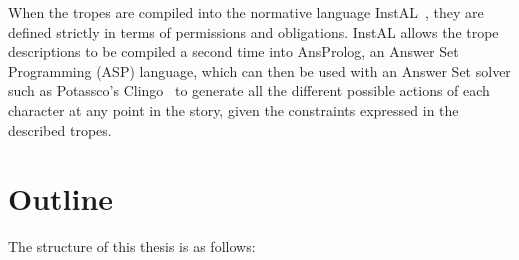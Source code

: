 \documentclass[11pt]{report}
\begin{document}
When the tropes are compiled into the normative language InstAL~\citep{cliffe2007specifying}, they are defined
strictly in terms of permissions and obligations. InstAL allows the trope
descriptions to be compiled a second time into AnsProlog, an Answer Set
Programming (ASP) language, which can then be used with an Answer Set solver
such as Potassco's Clingo~\citep{gebser2011potassco} to generate all the different
possible actions of each character at any point in the story, given the
constraints expressed in the described tropes.

\section{Outline}


The structure of this thesis is as follows:
\end{document}
